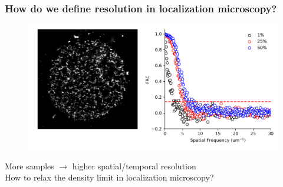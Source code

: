 \documentclass{beamer}					%
\begin{document}

\begin{frame}
\frametitle{How do we define resolution in localization microscopy?}

\begin{figure}
\includegraphics[width=13cm]{../../dissertation/dissertation/media/FRC.png}
\end{figure}

More samples $\rightarrow$ higher spatial/temporal resolution\\
How to relax the density limit in localization microscopy?

\end{frame}

\end{document}
